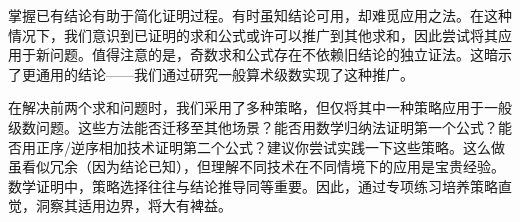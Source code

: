 掌握已有结论有助于简化证明过程。有时虽知结论可用，却难觅应用之法。在这种情况下，我们意识到已证明的求和公式或许可以推广到其他求和，因此尝试将其应用于新问题。值得注意的是，奇数求和公式存在不依赖旧结论的独立证法。这暗示了更通用的结论——我们通过研究一般算术级数实现了这种推广。

在解决前两个求和问题时，我们采用了多种策略，但仅将其中一种策略应用于一般级数问题。这些方法能否迁移至其他场景？能否用数学归纳法证明第一个公式？能否用正序/逆序相加技术证明第二个公式？建议你尝试实践一下这些策略。这么做虽看似冗余（因为结论已知），但理解不同技术在不同情境下的应用是宝贵经验。数学证明中，策略选择往往与结论推导同等重要。因此，通过专项练习培养策略直觉，洞察其适用边界，将大有裨益。
